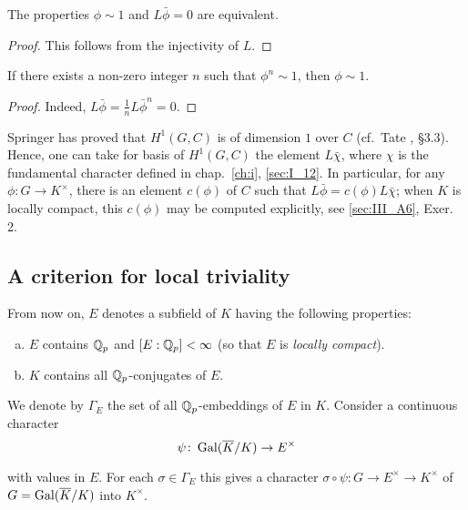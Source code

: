 \begin{subappendices}
\begin{prop}\label{prop:III_A2_3}
	The properties $\phi \sim 1$ and $L\bar{\phi} = 0$ are equivalent.
\end{prop}
\begin{proof}
This follows from the injectivity of $L$.
\end{proof}

\begin{corp}
If there exists a non-zero integer $n$ such that $\phi^n \sim 1$, then $\phi
\sim 1$.
\end{corp}
\begin{proof}
Indeed, $L\bar{\phi} = \frac{1}{n} L\bar{\phi}^n = 0$.
\end{proof}

\begin{obs}
Springer has proved that $H^1(G,C)$ is of dimension $1$ over $C$
(cf.\ Tate \cite{39}, \S3.3).
Hence, one can take for basis of $H^1(G,C)$ the element $L\bar{\chi}$, where
$\chi$ is the fundamental character defined in chap.~\ref{ch:i},
\ref{sec:I_12}.
In particular, for any $\phi \colon G \to K^\times$, there is an element
$c(\phi)$ of $C$ such that $L\bar{\phi} = c(\phi)L\bar{\chi}$; when $K$ is
locally compact, this $c(\phi)$ may be computed explicitly, see
\ref{sec:III_A6}, Exer. 2.
\end{obs}

\subsection{A criterion for local triviality}
\label{sec:III_A3}

From now on, $E$ denotes a subfield of $K$ having the following properties: 
\begin{enumerate}[(a)]
\item $E$ contains $\mathbb{Q}_p$ and $[E : \mathbb{Q}_p] < \infty$ (so that $E$ is \emph{locally
compact}).
\item $K$ contains all $\mathbb{Q}_p$-conjugates of $E$.
\end{enumerate}

We denote by $\Gamma_E$ the set of all $\mathbb{Q}_p$-embeddings of $E$ in $K$. Consider
a continuous character
\[
	\psi \colon \operatorname{Gal}(\overline{K}/K) \rightarrow E^\times
\]

with values in $E$. For each $\sigma \in \Gamma_E$ this gives a character
$\sigma \circ \psi \colon G \to E^\times \to K^\times$ of $G =
\operatorname{Gal}(\overline{K}/K)$ into $K^\times$.


\end{subappendices}
